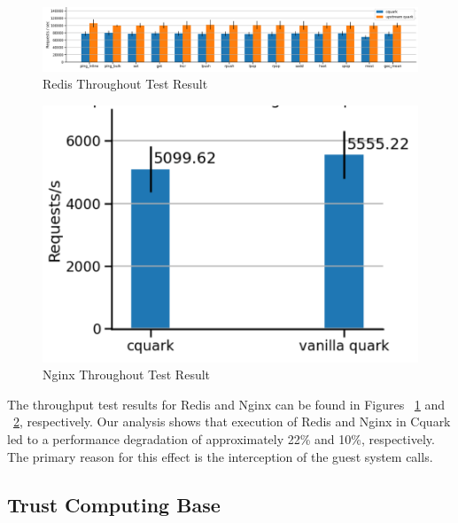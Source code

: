 \begin{figure}[H]
    \centering
    \includegraphics[width=1\textwidth]{images/redis_throughput.PNG}
    \caption[Redis Throughout Test]{Redis Throughout Test Result}
    \label{fig:redis_throughput}
\end{figure}


\begin{figure}[H]
    \centering
    \includegraphics[width=1\textwidth]{images/nginx_throughput.PNG}
    \caption[Nginx Throughout Test]{Nginx Throughout Test Result}
    \label{fig:nginx_throughput}
\end{figure}


The throughput test results for Redis and Nginx can be found in Figures ~\ref{fig:redis_throughput} and  ~\ref{fig:nginx_throughput}, respectively. Our analysis shows that execution of Redis and Nginx in Cquark led to a performance degradation of approximately 22\% and 10\%, respectively. The primary reason for this effect is the interception of 
the guest system calls.



\subsection{Trust Computing Base}



